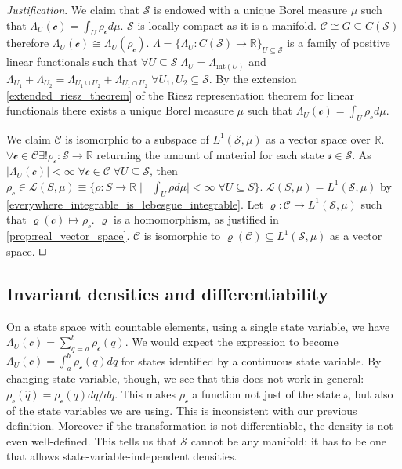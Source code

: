 \documentclass[smallextended]{svjour3}
\numberwithin{equation}{section}
\newenvironment{justification}{\emph{Justification}.}{\hfill\(\qed\)}
\begin{document}
\begin{justification}
	We claim that $\mathcal{S}$ is endowed with a unique Borel measure $\mu$ such that $\Lambda_U (\mathcal{c}) = \int_U \rho_{\mathcal{c}} d \mu$.  $\mathcal{S}$ is locally compact as it is a manifold. $\mathcal{C} \cong G \subseteq C(\mathcal{S})$ therefore $\Lambda_U(\mathcal{c}) \cong \Lambda_U(\rho_\mathcal{c})$. $\Lambda = \{\Lambda_U : C(\mathcal{S}) \rightarrow \mathbb{R}\}_{U \subseteq \mathcal{S}}$ is a family of positive linear functionals such that $\forall U \subseteq \mathcal{S} \; \Lambda_U = \Lambda_{\mathrm{int}(U)}$ and $\Lambda_{U_1} + \Lambda_{U_2} = \Lambda_{U_1 \cup U_2} + \Lambda_{U_1 \cap U_2} \; \forall U_1, U_2 \subseteq \mathcal{S}$. By the extension \ref{extended_riesz_theorem} of the Riesz representation theorem for linear functionals 
	there exists a unique Borel measure $\mu$ such that $\Lambda_U (\mathcal{c}) = \int_{U} \rho_\mathcal{c} d\mu$.

	We claim $\mathcal{C}$ is isomorphic to a subspace of $L^1(\mathcal{S}, \mu)$ as a vector space over $\mathbb{R}$. $\forall \mathcal{c} \in \mathcal{C} \exists ! \rho_{\mathcal{c}}:\mathcal{S} \rightarrow \mathbb{R}$ returning the amount of material for each state $\mathcal{s} \in \mathcal{S}$. As $|\Lambda_{U}(\mathcal{c})| < \infty \; \forall \mathcal{c} \in \mathcal{C} \; \forall U \subseteq \mathcal{S}$, then $\rho_{\mathcal{c}} \in \mathcal{L}(S,\mu) \equiv \{ \rho : S \rightarrow \mathbb{R} \; | \;\; |\int_{U} \rho d\mu| < \infty \; \forall U \subseteq S\}$. $\mathcal{L}(S,\mu) = L^1(\mathcal{S}, \mu)$ by \ref{everywhere_integrable_is_lebesgue_integrable}. Let $\varrho : \mathcal{C} \rightarrow L^1(\mathcal{S}, \mu)$ such that $\varrho(\mathcal{c}) \mapsto \rho_\mathcal{c}$. $\varrho$ is a homomorphism, as justified in \ref{prop:real_vector_space}. $\mathcal{C}$ is isomorphic to $\varrho(\mathcal{C}) \subseteq L^1(\mathcal{S}, \mu)$ as a vector space.
\end{justification}

\subsection{Invariant densities and differentiability}

On a state space with countable elements, using a single state variable, we have $\Lambda_U (\mathcal{c}) = \sum \limits_{q=a}^b \rho_\mathcal{c}(q)$. We would expect the expression to become $\Lambda_U (\mathcal{c}) = \int_a^b \rho_\mathcal{c} (q) dq$ for states identified by a continuous state variable. By changing state variable, though, we see that this does not work in general: $\rho_\mathcal{c}(\hat{q})= \rho_\mathcal{c}(q) dq/d\hat{q}$. This makes $\rho_\mathcal{c}$ a function not just of the state $\mathcal{s}$, but also of the state variables we are using. This is inconsistent with our previous definition. Moreover if the transformation is not differentiable, the density is not even well-defined. This tells us that $\mathcal{S}$ cannot be any manifold: it has to be one that allows state-variable-independent densities.
\end{document}

